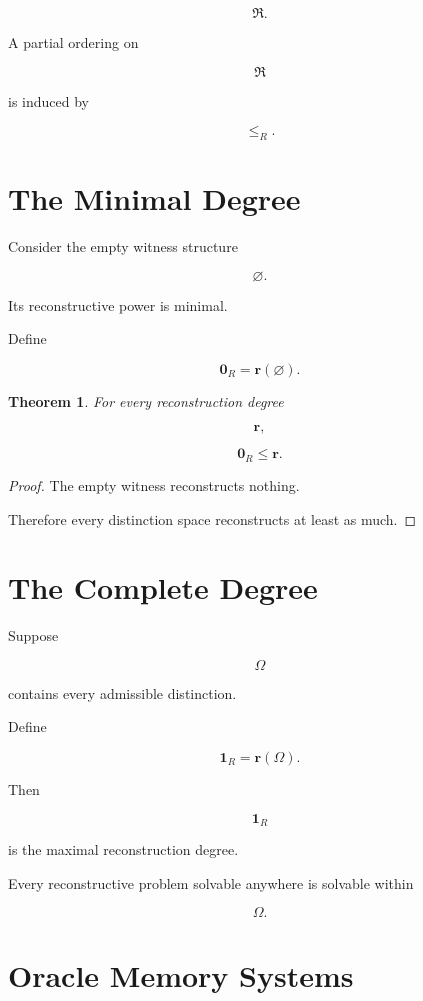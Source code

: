 \documentclass[12pt,oneside]{book}
\theoremstyle{plain} \newtheorem{theorem}{Theorem}[chapter] \newtheorem{lemma}[theorem]{Lemma} \newtheorem{proposition}[theorem]{Proposition} \newtheorem{corollary}[theorem]{Corollary}
\theoremstyle{definition} \newtheorem{definition}[theorem]{Definition} \newtheorem{axiom}[theorem]{Axiom} \newtheorem{construction}[theorem]{Construction}
\theoremstyle{remark} \newtheorem{remark}[theorem]{Remark} \newtheorem{example}[theorem]{Example}
\begin{document}
\[
\mathfrak R.
\]

A partial ordering on

\[
\mathfrak R
\]

is induced by

\[
\le_R.
\]

\section{The Minimal Degree}

Consider the empty witness structure

\[
\varnothing.
\]

Its reconstructive power is minimal.

Define

\[
\mathbf 0_R
=
\mathbf r(\varnothing).
\]

\begin{theorem}

For every reconstruction degree

\[
\mathbf r,
\]

\[
\mathbf 0_R
\le
\mathbf r.
\]

\end{theorem}

\begin{proof}

The empty witness reconstructs nothing.

Therefore every distinction space reconstructs at least as much.

\end{proof}

\section{The Complete Degree}

Suppose

\[
\Omega
\]

contains every admissible distinction.

Define

\[
\mathbf 1_R
=
\mathbf r(\Omega).
\]

Then

\[
\mathbf 1_R
\]

is the maximal reconstruction degree.

Every reconstructive problem solvable anywhere is solvable within

\[
\Omega.
\]

\section{Oracle Memory Systems}
\end{document}
